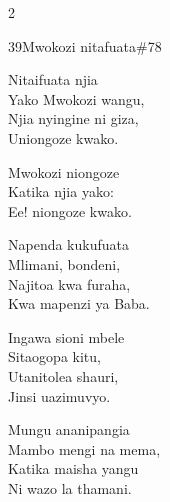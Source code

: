 \documentclass{article}
\begin{document}
\begin{multicols}{2}
\begin{hymn}{39}{Mwokozi nitafuata}{\#78}
\begin{stanza}
Nitaifuata njia\\
Yako Mwokozi wangu,\\
Njia nyingine ni giza,\\
Uniongoze kwako.
\end{stanza}
\begin{chorus}
Mwokozi niongoze\\
Katika njia yako:\\
Ee! niongoze kwako.
\end{chorus}
\begin{stanza}
Napenda kukufuata\\
Mlimani, bondeni,\\
Najitoa kwa furaha,\\
Kwa mapenzi ya Baba.
\end{stanza}
\begin{stanza}
Ingawa sioni mbele\\
Sitaogopa kitu,\\
Utanitolea shauri,\\
Jinsi uazimuvyo.
\end{stanza}
\begin{stanza}
Mungu ananipangia\\
Mambo mengi na mema,\\
Katika maisha yangu\\
Ni wazo la thamani.
\end{stanza}
\end{hymn}


\end{multicols}
\end{document}
